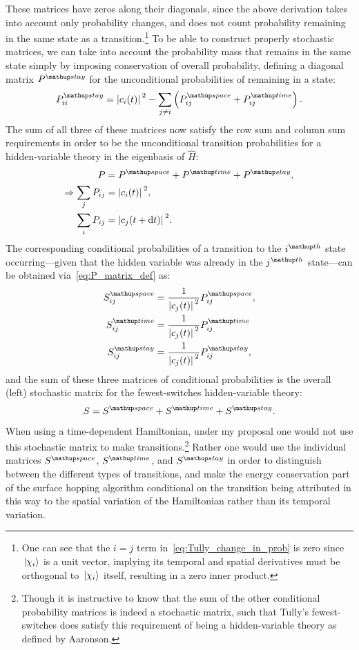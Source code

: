 These matrices have zeros along their diagonals, since the above derivation takes into account only probability changes, and does not count probability remaining in the same state as a transition.\footnote{One can see that the $i=j$ term in~\eqref{eq:Tully_change_in_prob} is zero since $\ket{\chi_i}$ is a unit vector, implying its temporal and spatial derivatives must be orthogonal to $\ket{\chi_i}$ itself, resulting in a zero inner product.} To be able to construct properly stochastic matrices, we can take into account the probability mass that remains in the same state simply by imposing conservation of overall probability, defining a diagonal matrix $P^\up{stay}$ for the unconditional probabilities of remaining in a state:
\begin{align}
P^\up{stay}_{ii} = \abs{c_i(t)}^2
- \sum_{j\neq i} \left(P^\up{space}_{ij} + P^\up{time}_{ij}\right).
\end{align}
The sum of all three of these matrices now satisfy the row sum and column sum requirements in order to be the unconditional transition probabilities for a hidden-variable theory in the eigenbasis of $\hat H$:
\begin{align}
P &= P^\up{space} + P^\up{time} + P^\up{stay},\\
\Rightarrow \sum_j P_{ij} &= \abs{c_i(t)}^2,\\
\sum_i P_{ij} &= \abs{c_j(t + \dd t)}^2.
\end{align}
The corresponding conditional probabilities of a transition to the $i^\up{th}$ state occurring---given that the hidden variable was already in the $j^\up{th}$ state---can be obtained via~\eqref{eq:P_matrix_def} as:
\begin{align}
S^\up{space}_{ij} &= \frac1{\abs{c_j(t)}^2} P^\up{space}_{ij},\label{eq:S_space}\\
S^\up{time}_{ij} &= \frac1{\abs{c_j(t)}^2} P^\up{time}_{ij}\label{eq:S_time}\\
S^\up{stay}_{ij} &= \frac1{\abs{c_j(t)}^2} P^\up{stay}_{ij}\label{eq:S_stay},
\end{align}
and the sum of these three matrices of conditional probabilities is the overall (left) stochastic matrix for the fewest-switches hidden-variable theory:
\begin{align}
S = S^\up{space} + S^\up{time} + S^\up{stay}.
\end{align}
When using a time-dependent Hamiltonian, under my proposal one would not use this stochastic matrix to make transitions.\footnote{Though it is instructive to know that the sum of the other conditional probability matrices is indeed a stochastic matrix, such that Tully's fewest-switches does satisfy this requirement of being a hidden-variable theory as defined by Aaronson.} Rather one would use the individual matrices $S^\up{space}$, $S^\up{time}$, and $S^\up{stay}$ in order to distinguish between the different types of transitions, and make the energy conservation part of the surface hopping algorithm conditional on the transition being attributed in this way to the spatial variation of the Hamiltonian rather than its temporal variation.

